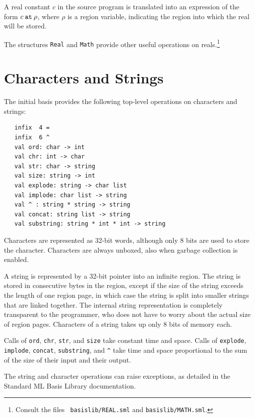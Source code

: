 \documentclass[12pt]{book}
\begin{document}
A real constant $c$ in the source program is translated into an
expression of the form 
%
$c\mathbin{\hbox{\tt at}}\rho$, where $\rho$ is a region variable, indicating the region
into which the real will be stored.

The structures {\tt Real} and {\tt Math} provide other useful
operations on reals.\footnote{Consult the files {\tt
    basislib/REAL.sml} and {\tt basislib/MATH.sml}.}

\section{Characters and Strings}
The 
%
initial basis provides the following top-level operations on characters and strings:
%
%
%
%
%
%
%
%
%
%
\begin{verbatim}
   infix  4 = 
   infix  6 ^
   val ord: char -> int
   val chr: int -> char
   val str: char -> string
   val size: string -> int
   val explode: string -> char list
   val implode: char list -> string
   val ^ : string * string -> string
   val concat: string list -> string
   val substring: string * int * int -> string
\end{verbatim}
Characters are represented as 32-bit words, although only 8 bits are
used to store the character. Characters are always unboxed, also when
garbage collection is enabled.

A string is represented by a 32-bit pointer into an infinite region.
The string is stored in consecutive bytes in the region, except if the
size of the string exceeds the length of one region page, in which
case the string is split into smaller strings that are linked
together. The internal string representation is completely transparent
to the programmer, who does not have to worry about the actual size of
region pages. Characters of a string takes up only 8 bits of
memory each.

Calls of {\tt ord}, {\tt chr}, {\tt str}, and {\tt size} take constant
time and space.  Calls of {\tt explode}, {\tt implode}, {\tt concat},
{\tt substring}, and \verb+^+ take time and space proportional to the
sum of the size of their input and their output.

The string and character operations can raise exceptions, as detailed in the
Standard ML Basis Library documentation.
\end{document}
